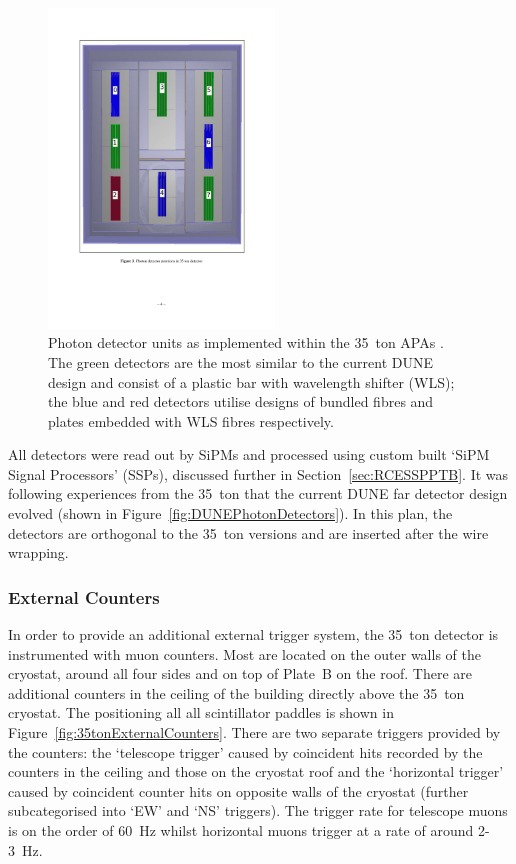 \begin{figure}
  \centering
  \includegraphics[width=6cm]{35tonPhotonDetectors.pdf}
  \caption[Photon detector units as implemented within the 35~ton APAs.]{Photon detector units as implemented within the 35~ton APAs \cite{35tonPhotonDetectors}.  The green detectors are the most similar to the current DUNE design and consist of a plastic bar with wavelength shifter (WLS); the blue and red detectors utilise designs of bundled fibres and plates embedded with WLS fibres respectively.}
  \label{fig:35tonPhotonDetectors}
\end{figure}

All detectors were read out by SiPMs and processed using custom built `SiPM Signal Processors' (SSPs), discussed further in Section~\ref{sec:RCESSPPTB}.  It was following experiences from the 35~ton that the current DUNE far detector design evolved (shown in Figure~\ref{fig:DUNEPhotonDetectors}).  In this plan, the detectors are orthogonal to the 35~ton versions and are inserted after the wire wrapping.

\subsubsection{External Counters}\label{sec:35tonExternalCounters}

In order to provide an additional external trigger system, the 35~ton detector is instrumented with muon counters.  Most are located on the outer walls of the cryostat, around all four sides and on top of Plate~B on the roof.  There are additional counters in the ceiling of the building directly above the 35~ton cryostat.  The positioning all all scintillator paddles is shown in Figure~\ref{fig:35tonExternalCounters}.  There are two separate triggers provided by the counters: the `telescope trigger' caused by coincident hits recorded by the counters in the ceiling and those on the cryostat roof and the `horizontal trigger' caused by coincident counter hits on opposite walls of the cryostat (further subcategorised into `EW' and `NS' triggers).  The trigger rate for telescope muons is on the order of 60~Hz whilst horizontal muons trigger at a rate of around 2-3~Hz.


